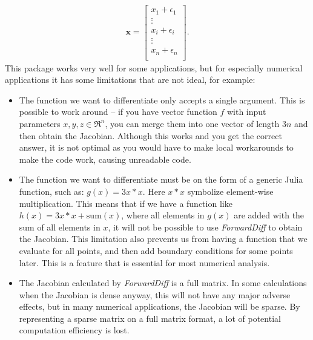 \begin{align*}
    \textbf{x} = \begin{bmatrix}
    x_1 + \epsilon_1 \\
    \vdots \\
    x_i + \epsilon_i \\
    \vdots \\
    x_n + \epsilon_n \\
    \end{bmatrix}.
\end{align*}
 This package works very well for some applications, but for especially numerical applications it has some limitations that are not ideal, for example: 
\begin{itemize}
    \item The function we want to differentiate only accepts a single argument. This is possible to work around -- if you have vector function $f$ with input parameters $x,y,z \in \Re^n$, you can merge them into one vector of length $3n$ and then obtain the Jacobian. Although this works and you get the correct answer, it is not optimal as you would have to make local workarounds to make the code work, causing unreadable code.
    \item The function we want to differentiate must be on the form of a generic Julia function, such as: $g(x) = 3x*x$. Here $x*x$ symbolize element-wise multiplication. This means that if we have a function like $h(x) = 3x*x + \text{sum}(x)$, where all elements in $g(x)$ are added with the sum of all elements in $x$, it will not be possible to use \textit{ForwardDiff} to obtain the Jacobian. This limitation also prevents us from having a function that we evaluate for all points, and then add boundary conditions for some points later. This is a feature that is essential for most numerical analysis.
    \item The Jacobian calculated by \textit{ForwardDiff} is a full matrix. In some calculations when the Jacobian is dense anyway, this will not have any major adverse effects, but in many numerical applications, the Jacobian will be sparse. By representing a sparse matrix on a full matrix format, a lot of potential computation efficiency is lost.
\end{itemize}

